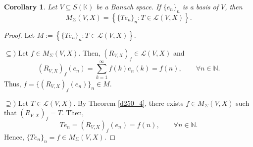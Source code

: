 \documentclass[14pt, a4paper]{article}  %
\providecommand{\pare}[1]{\left( #1\right) }
\newcommand{\K}{\mathbb{K}}
\newcommand{\N}{\mathbb{N}}
\newtheorem{corollary}{Corollary}[section]
\begin{document}
\begin{corollary}\label{naty26}
	Let $V \subseteq S(\K)$ be a Banach space. If $\{e_{n}\}_{n}$ is a basis of $V$, then
	\begin{equation}
		M_{\Sigma}(V, X) = \left\{ \{Te_{n}\}_{n} : T \in \mathcal{L}(V, X) \right\}.
	\end{equation}
\end{corollary}
\begin{proof} Let $M := \left\{ \{Te_{n}\}_{n} : T \in \mathcal{L}(V, X) \right\}$.
	
	$\subseteq)$ Let $f \in M_{\Sigma}(V, X)$. Then, $(R_{V,X})_{f} \in \mathcal{L}(V, X)$ and
\begin{equation}
	(R_{V,X})_{f}(e_{n}) = \sum_{k=1}^{\infty} f(k) e_{n}(k) = f(n), \qquad \forall n \in \N.
\end{equation}
	Thus, $f = \{(R_{V,X})_{f}(e_{n})\}_{n} \in M$.
	
	$\supseteq)$ Let $T \in \mathcal{L}\pare{V,X}$. By Theorem \ref{d250_4}, there exists $f \in M_{\Sigma}(V, X)$ such that $(R_{V,X})_{f} = T$. Then, 
\begin{equation}
		Te_{n} = (R_{V,X})_{f}(e_{n}) = f(n), \qquad \forall n \in \N.
\end{equation}
	Hence, $\{Te_{n}\}_{n} = f \in M_{\Sigma}(V, X)$.
\end{proof}

	
\end{document}
